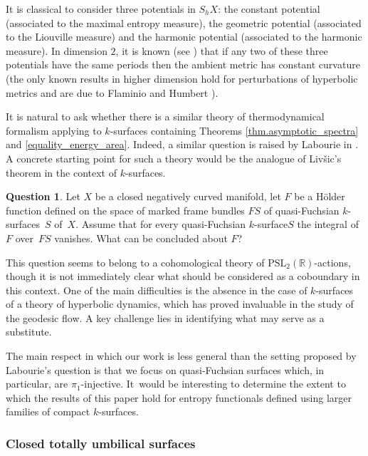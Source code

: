 \documentclass[10pt]{amsart}
\newcommand{\ksurface}{$k$\nobreakdash-surface\xspace}
\newcommand{\ksurfaces}{$k$\nobreakdash-surfaces\xspace}
\theoremstyle{plain}
\theoremstyle{definition}
\newtheorem{question}[theorem]{Question}
\newcommand\PSL{\mathrm{PSL}_2(\mathbb{R})}
\begin{document}
It is classical to consider three potentials in $S_hX$: the constant potential (associated to the maximal entropy measure), the geometric potential (associated to the Liouville measure) and the harmonic potential (associated to the harmonic measure). In dimension $2$, it is known (see \cite{Katok_entropy_closed,Katok4,Ledrappier_har_BM}) that if any two of these three potentials have the same periods then the ambient metric has constant curvature (the only known results in higher dimension hold for perturbations of hyperbolic metrics and are due to Flaminio \cite{Flaminio} and Humbert \cite{humbert2024katok}).

It is natural to ask whether there is a similar theory of thermodynamical formalism applying to \ksurfaces containing Theorems \ref{thm.asymptotic_spectra} and \ref{equality_energy_area}. Indeed, a similar question is raised by Labourie in \cite[Quest.\,8]{Labourie_phase_space}. A concrete starting point for such a theory would be the analogue of Liv\v{s}ic's theorem in the context of \ksurfaces.

\begin{question}
Let $X$ be a closed negatively curved manifold, let $F$ be a Hölder function defined on the space of marked frame bundles $FS$ of quasi-Fuchsian $k$\nobreakdash-sur\-faces~$S$ of~$X$. Assume that for every quasi-Fuchsian \ksurface $S$ the integral of $F$ over~$FS$ vanishes. What can be concluded about $F$?
\end{question}

This question seems to belong to a cohomological theory of $\PSL$-actions, though it is not immediately clear what should be considered as a coboundary in this context. One of the main difficulties is the absence in the case of \ksurfaces of a theory of hyperbolic dynamics, which has proved invaluable in the study of the geodesic flow. A key challenge lies in identifying what may serve as a substitute.

The main respect in which our work is less general than the setting proposed by Labourie's question is that we focus on quasi-Fuchsian surfaces which, in particular, are $\pi_1$-injective. It~would be interesting to determine the extent to which the results of this paper hold for entropy functionals defined using larger families of compact \ksurfaces.

\subsubsection{Closed totally umbilical surfaces}
\end{document}
